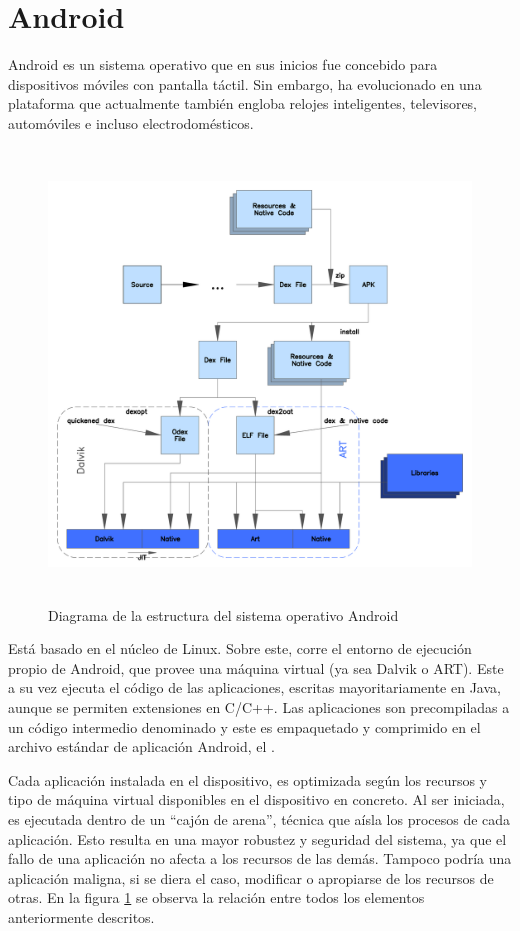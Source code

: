 \FloatBarrier
\section{Android}
\label{sec:AndroidIntro}
    Android es un sistema operativo que en sus inicios fue concebido para dispositivos móviles con pantalla táctil. Sin embargo, ha evolucionado en una plataforma que actualmente también engloba relojes inteligentes, televisores, automóviles e incluso electrodomésticos.

\begin{figure}[h] \centering
    \includegraphics[height=12cm]{graphs/ART_view.png} \caption{Diagrama de la estructura del sistema operativo Android\cite{androiddevguide} }\label{fig:diagrama:ART}
\end{figure}

    Está basado en el núcleo de Linux. Sobre este, corre el entorno de ejecución propio de Android, que provee una máquina virtual (ya sea Dalvik o ART). Este a su vez ejecuta el código de las aplicaciones, escritas mayoritariamente en Java, aunque se permiten extensiones en C/C++. Las aplicaciones son precompiladas a un código intermedio denominado  y este es empaquetado y comprimido en el archivo estándar de aplicación Android, el . 

    Cada aplicación instalada en el dispositivo, es optimizada según los recursos y tipo de máquina virtual disponibles en el dispositivo en concreto. Al ser iniciada, es ejecutada dentro de un ``cajón de arena'', técnica que aísla los procesos de cada aplicación. Esto resulta en una mayor robustez y seguridad del sistema, ya que el fallo de una aplicación no afecta a los recursos de las demás. Tampoco podría una aplicación maligna, si se diera el caso, modificar o apropiarse de los recursos de otras. En la figura \ref{fig:diagrama:ART} se observa la relación entre todos los elementos anteriormente descritos.

